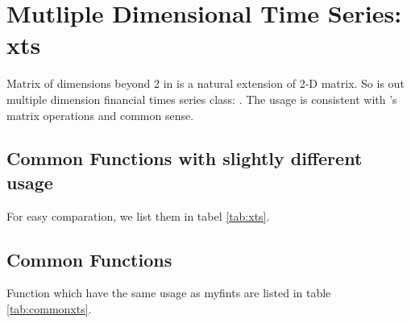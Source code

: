 \section{Mutliple Dimensional Time Series: xts\label{sec:xts}}

Matrix of dimensions beyond 2 in \matlab{} is a natural extension of 2-D matrix.
So is out multiple dimension financial times series class: .
The usage is consistent with \matlab{}'s matrix operations and common sense.

\subsection{Common Functions with slightly different usage}

For easy comparation, we list them in tabel \ref{tab:xts}.

\subsection{Common Functions}

Function which have the same usage as myfints are listed in table \ref{tab:commonxts}.


